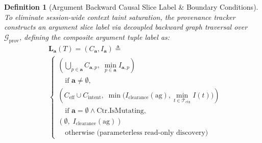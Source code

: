 \documentclass[conference,10pt]{IEEEtran}
\newtheorem{definition}{Definition}
\begin{document}
\begin{definition}[Argument Backward Causal Slice Label \& Boundary Conditions]
\label{def:slice_label}
To eliminate session-wide context taint saturation, the provenance tracker constructs an argument slice label via decoupled backward graph traversal over $\mathcal{G}_{\text{prov}}$, defining the composite argument tuple label as:
\begin{equation}
\label{eq:slice_label}
\begin{split}
&\mathbf{L}_{\mathbf{a}}(T) = (C_{\mathbf{a}}, I_{\mathbf{a}}) \triangleq \\
&\begin{cases}
\left( \bigcup_{p \in \mathbf{a}} C_{\mathbf{a}, p}, \; \min_{p \in \mathbf{a}} I_{\mathbf{a}, p} \right) \\
\quad \text{if } \mathbf{a} \ne \emptyset, \\[3pt]
\left( C_{\text{eff}} \cup C_{\text{intent}}, \; \min\big(I_{\text{clearance}}(\text{ag}), \min_{t \in \mathcal{T}_{\text{ctx}}} I(t)\big) \right) \\
\quad \text{if } \mathbf{a} = \emptyset \land \text{Ctr.IsMutating}, \\[3pt]
(\emptyset, \; I_{\text{clearance}}(\text{ag})) \\
\quad \text{otherwise (parameterless read-only discovery)}
\end{cases}
\end{split}
\end{equation}

\end{definition}
\end{document}

